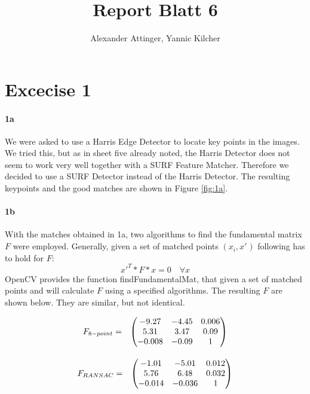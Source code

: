 \documentclass[11pt,a4paper]{article}
\author{Alexander Attinger, Yannic Kilcher}
\title{Report Blatt 6}
\begin{document}
\maketitle

\section{Excecise 1}
\paragraph{1a}
We were asked to use a Harris Edge Detector to locate key points in the images. We tried this, but as in sheet five already noted, the Harris Detector does not seem to work very well together with a SURF Feature Matcher. Therefore we decided to use a SURF Detector instead of the Harris Detector. The resulting keypoints and the good matches are shown in Figure \ref{fig:1a}.
\paragraph{1b}
With the matches obtained in 1a, two algorithms to find the fundamental matrix $F$ were employed. Generally, given a set of matched points $(x_{i},x'_{})$ following has to hold for $F$:
\begin{equation}
x'^{T}*F*x=0 \quad \forall x
\label{eq:1}
\end{equation}
OpenCV provides the function findFundamentalMat, that given a set of matched points and will calculate $F$ using a specified algorithms. The resulting $F$ are shown below. They are similar, but not identical.

\[
\begin{array}{lc}
F_{8-point} = & \left(\begin{array}{@{}ccc@{}}
                    -9.27 & -4.45 & 0.006 \\
                    5.31 & 3.47 & 0.09 \\
                    -0.008 & -0.09 & 1
                  \end{array}\right) \\[15pt]
  
\end{array} 
\]

\[
\begin{array}{lc}
F_{RANSAC} = & \left(\begin{array}{@{}ccc@{}}
                    -1.01 & -5.01 & 0.012 \\
                    5.76 & 6.48 & 0.032 \\
                    -0.014 & -0.036 & 1
                  \end{array}\right)\\ [15pt]
  
\end{array} 
\]
\end{document}
